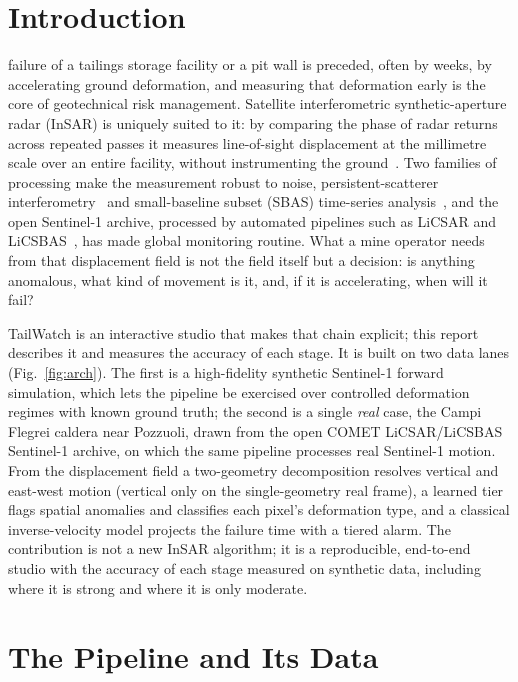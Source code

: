 \documentclass[journal]{IEEEtran}
\begin{document}
\section{Introduction}

 failure of a tailings storage facility or a pit wall is preceded, often by weeks, by
accelerating ground deformation, and measuring that deformation early is the core of geotechnical risk
management. Satellite interferometric synthetic-aperture radar (InSAR) is uniquely suited to it: by comparing the
phase of radar returns across repeated passes it measures line-of-sight displacement at the millimetre scale over
an entire facility, without instrumenting the ground~\cite{massonnet,rosen}. Two families of processing make the
measurement robust to noise, persistent-scatterer interferometry~\cite{ferretti,hooper} and small-baseline subset
(SBAS) time-series analysis~\cite{berardino}, and the open Sentinel-1 archive, processed by automated
pipelines such as LiCSAR and LiCSBAS~\cite{lazecky,morishita}, has made global monitoring routine. What a mine
operator needs from that displacement field is not the field itself but a decision: is anything anomalous, what
kind of movement is it, and, if it is accelerating, when will it fail?

TailWatch is an interactive studio that makes that chain explicit; this report describes it and measures the
accuracy of each stage. It is built on two data lanes (Fig.~\ref{fig:arch}). The first is a high-fidelity synthetic
Sentinel-1 forward simulation, which lets the pipeline be exercised over controlled deformation regimes with
known ground truth; the second is a single \emph{real} case, the Campi Flegrei caldera near Pozzuoli, drawn from
the open COMET LiCSAR/LiCSBAS Sentinel-1 archive, on which the same pipeline processes real Sentinel-1 motion.
From the displacement field a two-geometry decomposition resolves vertical and east-west motion (vertical only on
the single-geometry real frame), a learned tier flags spatial anomalies and classifies each pixel's deformation
type, and a classical inverse-velocity model projects the failure time with a tiered alarm. The contribution is
not a new InSAR algorithm; it is a reproducible, end-to-end studio with the accuracy of each stage measured on
synthetic data, including where it is strong and where it is only moderate.

\section{The Pipeline and Its Data}\label{sec:pipeline}
\end{document}
